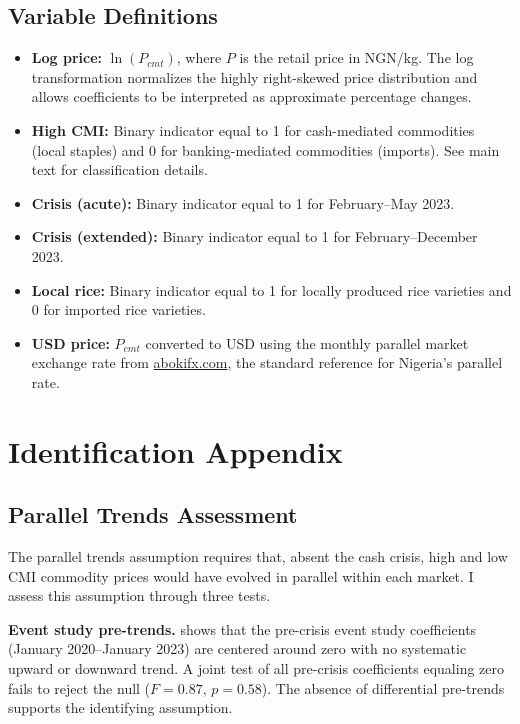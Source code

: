 \documentclass[12pt]{article}
\begin{document}
\subsection{Variable Definitions}

\begin{itemize}
\item \textbf{Log price:} $\ln(P_{cmt})$, where $P$ is the retail price in NGN/kg. The log transformation normalizes the highly right-skewed price distribution and allows coefficients to be interpreted as approximate percentage changes.

\item \textbf{High CMI:} Binary indicator equal to 1 for cash-mediated commodities (local staples) and 0 for banking-mediated commodities (imports). See main text for classification details.

\item \textbf{Crisis (acute):} Binary indicator equal to 1 for February--May 2023.

\item \textbf{Crisis (extended):} Binary indicator equal to 1 for February--December 2023.

\item \textbf{Local rice:} Binary indicator equal to 1 for locally produced rice varieties and 0 for imported rice varieties.

\item \textbf{USD price:} $P_{cmt}$ converted to USD using the monthly parallel market exchange rate from \url{abokifx.com}, the standard reference for Nigeria's parallel rate.
\end{itemize}


\section{Identification Appendix}
\label{app:identification}

\subsection{Parallel Trends Assessment}

The parallel trends assumption requires that, absent the cash crisis, high and low CMI commodity prices would have evolved in parallel within each market. I assess this assumption through three tests.

\textbf{Event study pre-trends.}  shows that the pre-crisis event study coefficients (January 2020--January 2023) are centered around zero with no systematic upward or downward trend. A joint test of all pre-crisis coefficients equaling zero fails to reject the null ($F = 0.87$, $p = 0.58$). The absence of differential pre-trends supports the identifying assumption.
\end{document}
